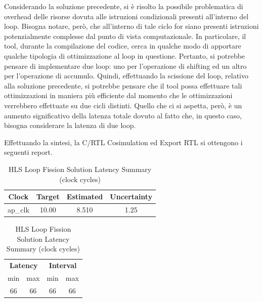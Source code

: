 Considerando la soluzione precedente, si è risolto la possibile problematica di overhead delle risorse dovuta alle istruzioni condizionali presenti all'interno del loop. Bisogna notare, però, che all'interno di tale ciclo for siano presenti istruzioni potenzialmente complesse dal punto di vista computazionale. In particolare, il tool, durante la compilazione del codice, cerca in qualche modo di apportare qualche tipologia di ottimizzazione al loop in questione. Pertanto, si potrebbe pensare di implementare due loop: uno per l'operazione di shifting ed un altro per l'operazione di accumulo. Quindi, effettuando la scissione del loop, relativo alla soluzione precedente, si potrebbe pensare che il tool possa effettuare tali ottimizzazioni in maniera più efficiente dal momento che le ottimizzazioni verrebbero effettuate su due cicli distinti. Quello che ci si aspetta, però, è un aumento significativo della latenza totale dovuto al fatto che, in questo caso, bisogna considerare la latenza di due loop.


Effettuando la sintesi, la C/RTL Cosimulation ed Export RTL si ottengono i seguenti report.

\begin{table}[H]
    \centering
    \begin{minipage}[t]{0.45\linewidth}
        \centering
        \begin{tabular}{|c|c|c|c|}
            \hline
            \textbf{Clock} & \textbf{Target} & \textbf{Estimated} & \textbf{Uncertainty} \\
            \hline
            ap\_clk & 10.00 & 8.510 & 1.25 \\
            \hline
        \end{tabular}
        \caption{HLS Loop Fission Solution Timing Summary (ns)}
        \label{tab:hls-loop-fission-solution-timing-summary}
    \end{minipage}
    \hfill
    \begin{minipage}[t]{0.45\linewidth}
        \centering
        \begin{tabular}{|c|c|c|c|}
            \hline
            \multicolumn{2}{|c|}{\textbf{Latency}} & \multicolumn{2}{|c|}{\textbf{Interval}} \\
            min & max & min & max \\
            \hline
            66 & 66 & 66 & 66 \\
            \hline
        \end{tabular}
        \caption{HLS Loop Fission Solution Latency Summary (clock cycles)}
        \label{tab:hls-loop-fission-solution-latency-summary}
    \end{minipage}
\end{table}

